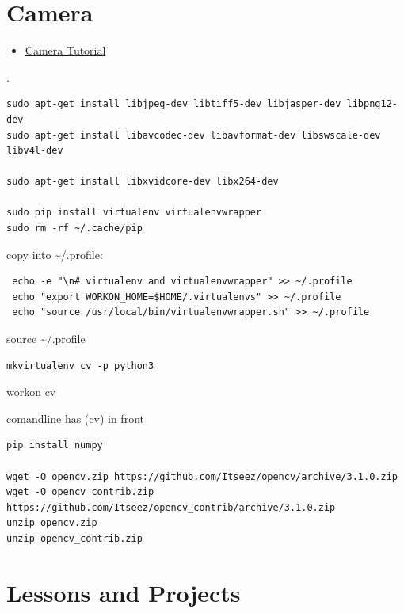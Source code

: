 \section{Camera}\label{camera}

\begin{itemize}
\tightlist
\item
  \href{https://www.raspberrypi.org/learning/getting-started-with-picamera/worksheet/}{Camera
  Tutorial}
\end{itemize}

.

\begin{verbatim}
sudo apt-get install libjpeg-dev libtiff5-dev libjasper-dev libpng12-dev
sudo apt-get install libavcodec-dev libavformat-dev libswscale-dev libv4l-dev

sudo apt-get install libxvidcore-dev libx264-dev

sudo pip install virtualenv virtualenvwrapper
sudo rm -rf ~/.cache/pip
\end{verbatim}

copy into \textasciitilde{}/.profile:

\begin{verbatim}
 echo -e "\n# virtualenv and virtualenvwrapper" >> ~/.profile
 echo "export WORKON_HOME=$HOME/.virtualenvs" >> ~/.profile
 echo "source /usr/local/bin/virtualenvwrapper.sh" >> ~/.profile
\end{verbatim}

source \textasciitilde{}/.profile

\begin{verbatim}
mkvirtualenv cv -p python3
\end{verbatim}

workon cv

comandline has (cv) in front

\begin{verbatim}
pip install numpy

wget -O opencv.zip https://github.com/Itseez/opencv/archive/3.1.0.zip
wget -O opencv_contrib.zip https://github.com/Itseez/opencv_contrib/archive/3.1.0.zip
unzip opencv.zip
unzip opencv_contrib.zip
\end{verbatim}

\section{Lessons and Projects}\label{lessons-and-projects}

